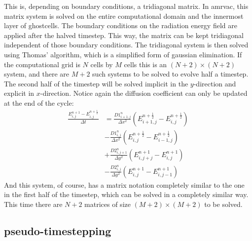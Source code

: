 This is, depending on boundary conditions, a tridiagonal matrix. In amrvac, this matrix system is solved on the entire computational domain and the innermost layer of ghostcells. The boundary conditions on the radiation energy field are applied after the halved timestep. This way, the matrix can be kept tridiagonal independent of those boundary conditions. The tridiagonal system is then solved using Thomas' algorithm, which is a simplified form of gaussian elimination. If the computational grid is $N$ cells by $M$ cells this is an $(N+2) \times (N+2)$ system, and there are $M+2$ such systems to be solved to evolve half a timestep. \\

The second half of the timestep will be solved implicit in the $y$-direction and explicit in $x$-direction. Notice again the diffusion coefficient can only be updated at the end of the cycle:
\begin{align}
\frac{E_{i,j}^{n+1} - E_{i,j}^{n+\frac{1}{2}}}{\Delta t}
 &= \frac{D1_{i+1,j}^{n}}{\Delta x^2} (E_{i+1,j}^{n+\frac{1}{2}} - E_{i,j}^{n+\frac{1}{2}}) \\
 &- \frac{D1_{i,j}^{n}}{\Delta x^2} (E_{i,j}^{n+\frac{1}{2}} - E_{i-1,j}^{n+\frac{1}{2}}) \\
 &+ \frac{D2_{i,j+1}^{n}}{\Delta y^2} (E_{i,j+j}^{n+1} - E_{i,j}^{n+1}) \\
 &- \frac{D2_{i,j}^{n}}{\Delta y^2} (E_{i,j}^{n+1} - E_{i,j-1}^{n+1})
\end{align}
And this system, of course, has a matrix notation completely similar to the one in the first half of the timestep, which can be solved in a completely similar way. This time there are $N+2$ matrices of size $(M+2) \times (M+2)$ to be solved.

\subsection{pseudo-timestepping}
